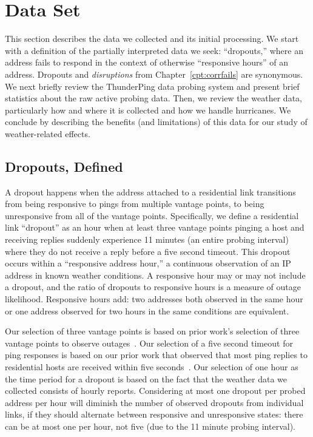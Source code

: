\section{Data Set}

This section describes the data we collected and its initial
processing.
%
We start with a definition of the partially interpreted data
we seek: ``dropouts,'' where an address fails to respond in
the context of otherwise ``responsive hours'' of an address.
%
Dropouts and \emph{disruptions} from Chapter~\ref{cpt:corrfails} are synonymous.
%
We next briefly review the ThunderPing data probing system and
present brief statistics about the raw active probing data.
% 
Then, we review the weather data, particularly how and
where it is collected and how we handle hurricanes.
%
We conclude by describing the benefits (and limitations) of this
data for our study of weather-related effects.

\subsection{Dropouts, Defined} %

A dropout happens when the address attached to a residential link transitions from
being responsive to pings from multiple vantage points, to being unresponsive
from all of the vantage points.
% 
Specifically, we define a residential link ``dropout'' as an hour when at least three
vantage points pinging a host and receiving replies suddenly experience 11 minutes
(an entire probing interval) where they do not receive a 
reply before a five second timeout.
%
This dropout occurs within a ``responsive address hour,'' a
continuous observation of an IP address in known weather
conditions.  A responsive hour may or may not include a
dropout, and the ratio of dropouts to responsive hours is a
measure of outage likelihood.  Responsive hours add: two
addresses both observed in the same hour or one address
observed for two hours in the same conditions are equivalent.

Our selection of three vantage points is based on prior work's selection
of three vantage points to observe outages~\cite{trinocular}.
%
Our selection of a five second timeout for ping responses is based on our
prior work that observed that most ping replies to residential
hosts are received within five seconds~\cite{timeouts}.
%
Our selection of one hour as the time period for a dropout is based on the fact
that the weather data we collected consists of hourly reports.
%
Considering at most one dropout per probed address per hour will diminish the
number of observed dropouts from individual links, if they should alternate
between responsive and unresponsive states: there can be at most one per hour,
not five (due to the 11 minute probing interval).


